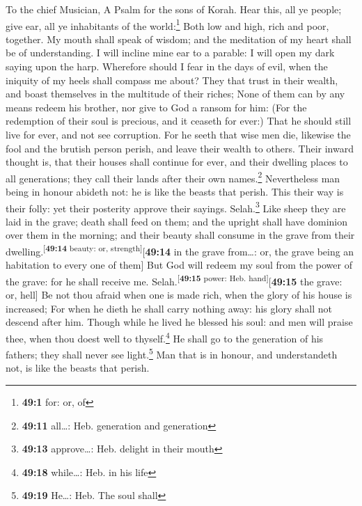 To the chief Musician, A Psalm for the sons of Korah. 
Hear this, all ye people; give ear, all ye inhabitants of the
world:\footnote{\textbf{49:1} for: or, of}  Both low and
high, rich and poor, together.  My mouth shall speak of
wisdom; and the meditation of my heart shall be of understanding.
 I will incline mine ear to a parable: I will open my dark
saying upon the harp.  Wherefore should I fear in the days
of evil, when the iniquity of my heels shall compass me about?
 They that trust in their wealth, and boast themselves in
the multitude of their riches;  None of them can by any
means redeem his brother, nor give to God a ransom for him:
 (For the redemption of their soul is precious, and it
ceaseth for ever:)  That he should still live for ever,
and not see corruption.  For he seeth that wise men die,
likewise the fool and the brutish person perish, and leave their wealth
to others.  Their inward thought is, that their houses
shall continue for ever, and their dwelling places to all generations;
they call their lands after their own names.\footnote{\textbf{49:11}
  all\ldots: Heb. generation and generation} 
Nevertheless man being in honour abideth not: he is like the beasts that
perish.  This their way is their folly: yet their
posterity approve their sayings. Selah.\footnote{\textbf{49:13}
  approve\ldots: Heb. delight in their mouth}  Like sheep
they are laid in the grave; death shall feed on them; and the upright
shall have dominion over them in the morning; and their beauty shall
consume in the grave from their
dwelling.\textsuperscript{{[}\textbf{49:14} beauty: or,
strength{]}}{[}\textbf{49:14} in the grave from\ldots: or, the grave
being an habitation to every one of them{]}  But God will
redeem my soul from the power of the grave: for he shall receive me.
Selah.\textsuperscript{{[}\textbf{49:15} power: Heb.
hand{]}}{[}\textbf{49:15} the grave: or, hell{]}  Be not
thou afraid when one is made rich, when the glory of his house is
increased;  For when he dieth he shall carry nothing
away: his glory shall not descend after him.  Though
while he lived he blessed his soul: and men will praise thee, when thou
doest well to thyself.\footnote{\textbf{49:18} while\ldots: Heb. in his
  life}  He shall go to the generation of his fathers;
they shall never see light.\footnote{\textbf{49:19} He\ldots: Heb. The
  soul shall}  Man that is in honour, and understandeth
not, is like the beasts that perish.

